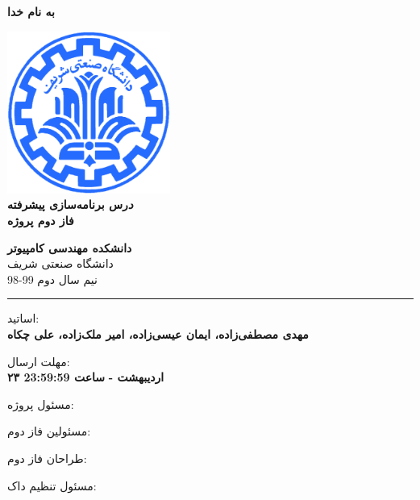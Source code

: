 \documentclass[]{article}
\begin{document}
\begin{titlepage}
\begin{center}

\textbf{ \Huge{به نام خدا} }
        
\vspace{0.2cm}

\includegraphics[width=0.4\textwidth]{sharif1.png}\\
\vspace{0.2cm}
\textbf{ \Huge{\emph درس برنامه‌سازی پیشرفته} }\\
\vspace{0.25cm}
\textbf{ \Large{ فاز دوم پروژه} }
\vspace{0.2cm}
       
 
      \large \textbf{دانشکده مهندسی کامپیوتر}\\\vspace{0.1cm}
    \large   دانشگاه صنعتی شریف\\\vspace{0.2cm}
       \large   ﻧﯿﻢ سال دوم 99-98 \\\vspace{0.10cm}
      \noindent\rule[1ex]{\linewidth}{1pt}
اساتید:\\
    \textbf{{مهدی مصطفی‌زاده، ایمان عیسی‌زاده، امیر ملک‌زاده، علی چکاه}}



    \vspace{0.20cm}

   مهلت ارسال:\\
    \textbf{{۲۳ اردیبهشت - }}
    \textbf{{ساعت 23:59:59}}

    \vspace{0.10cm}
مسئول پروژه:\\
    \textbf{}
    
        \vspace{0.10cm}
مسئولین فاز دوم:\\
    \textbf{}
    
        \vspace{0.10cm}
طراحان فاز دوم:\\
    \textbf{\authorFont{}}
    
        \vspace{0.05cm}
مسئول تنظیم داک:\\
    \textbf{}
    

\end{center}
\end{titlepage}
\end{document}
